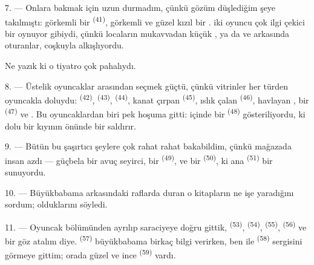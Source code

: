 7. --- Onlara bakmak için uzun durmadım, çünkü gözüm düşlediğim şeye
takılmıştı: görkemli bir  \textsuperscript{(41)},
görkemli  ve güzel kızıl bir .
 iki oyuncu çok ilgi çekici bir 
 oynuyor gibiydi, çünkü locaların mukavvadan küçük
, ya da  ve 
 arkasında oturanlar, coşkuyla alkışlıyordu.

Ne yazık ki o tiyatro çok pahalıydı.

8. --- Üstelik oyuncaklar arasından seçmek güçtü, çünkü vitrinler her türden
oyuncakla doluydu:  \textsuperscript{(42)},
 \textsuperscript{(43)}, 
\textsuperscript{(44)}, kanat çırpan 
\textsuperscript{(45)}, ıslık çalan 
\textsuperscript{(46)}, havlayan , bir 
\textsuperscript{(47)} ve . Bu oyuncaklardan biri pek
hoşuma gitti: içinde bir  \textsuperscript{(48)}
gösteriliyordu, ki  dolu bir kıyının
önünde  bir  saldırır.


9. --- Bütün bu şaşırtıcı şeylere çok rahat rahat bakabildim, çünkü mağazada
insan azdı --- güçbela bir avuç seyirci, bir 
\textsuperscript{(49)}, ve bir  \textsuperscript{(50)}, ki
ana  \textsuperscript{(51)} bir  sunuyordu.

10. --- Büyükbabama  arkasındaki raflarda duran o kitapların
ne işe yaradığını sordum;  olduklarını söyledi.

\VUsaut{3.6mm}
\VUsaut{2.8mm}

11. --- Oyuncak bölümünden ayrılıp saraciyeye doğru gittik, 
\textsuperscript{(53)},  \textsuperscript{(54)},
 \textsuperscript{(55)}, 
\textsuperscript{(56)} ve  bir göz atalım diye.
 \textsuperscript{(57)} büyükbabama birkaç bilgi verirken,
ben  ile  \textsuperscript{(58)} sergisini
görmeye gittim; orada güzel  ve ince
 \textsuperscript{(59)} vardı.

